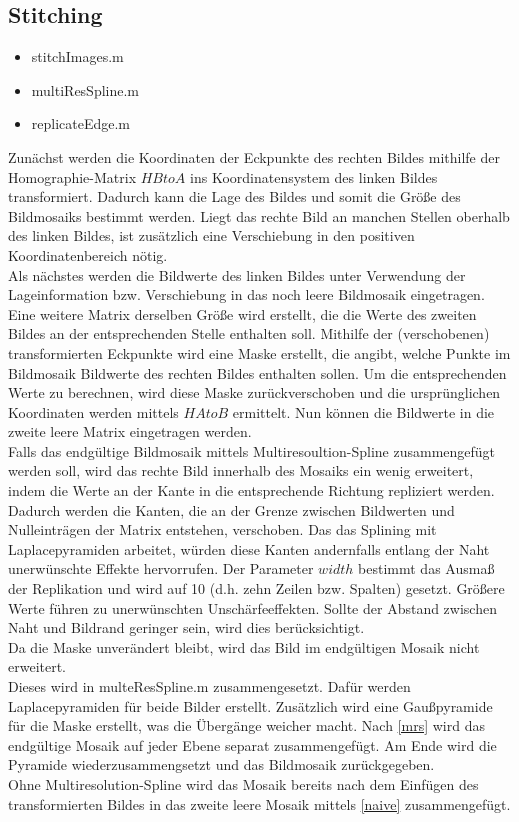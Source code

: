 \documentclass[deutsch]{scrartcl}
\begin{document}
\subsection{Stitching}
\begin{itemize}
	\item stitchImages.m 
	\item multiResSpline.m 
	\item replicateEdge.m
\end{itemize}
Zunächst werden die Koordinaten der Eckpunkte des rechten Bildes mithilfe der Homographie-Matrix $HBtoA$ ins Koordinatensystem des linken Bildes transformiert. Dadurch kann die Lage des Bildes und somit die Größe des Bildmosaiks bestimmt werden. Liegt das rechte Bild an manchen Stellen oberhalb des linken Bildes, ist zusätzlich eine Verschiebung in den positiven Koordinatenbereich nötig. \\
Als nächstes werden die Bildwerte des linken Bildes unter Verwendung der Lageinformation bzw. Verschiebung in das noch leere Bildmosaik eingetragen. \\
Eine weitere Matrix derselben Größe wird erstellt, die die Werte des zweiten Bildes an der entsprechenden Stelle enthalten soll. Mithilfe der (verschobenen) transformierten Eckpunkte wird eine Maske erstellt, die angibt, welche Punkte im Bildmosaik Bildwerte des rechten Bildes enthalten sollen. Um die entsprechenden Werte zu berechnen, wird diese Maske zurückverschoben und die ursprünglichen Koordinaten werden mittels $HAtoB$ ermittelt. Nun können die Bildwerte in die zweite leere Matrix eingetragen werden. \\
Falls das endgültige Bildmosaik mittels Multiresoultion-Spline zusammengefügt werden soll, wird das rechte Bild innerhalb des Mosaiks ein wenig erweitert, indem die Werte an der Kante in die entsprechende Richtung repliziert werden. Dadurch werden die Kanten, die an der Grenze zwischen Bildwerten und Nulleinträgen der Matrix entstehen, verschoben. Das das Splining mit Laplacepyramiden arbeitet, würden diese Kanten andernfalls entlang der Naht unerwünschte Effekte hervorrufen. Der Parameter $width$ bestimmt das Ausmaß der Replikation und wird auf 10 (d.h. zehn Zeilen bzw. Spalten) gesetzt. Größere Werte führen zu unerwünschten Unschärfeeffekten. Sollte der Abstand zwischen Naht und Bildrand geringer sein, wird dies berücksichtigt. \\
 Da die Maske unverändert bleibt, wird das Bild im endgültigen Mosaik nicht erweitert. \\
Dieses wird in multeResSpline.m zusammengesetzt. Dafür werden Laplacepyramiden für beide Bilder erstellt. Zusätzlich wird eine Gaußpyramide für die Maske erstellt, was die Übergänge weicher macht. Nach \eqref{mrs} wird das endgültige Mosaik auf jeder Ebene separat zusammengefügt. Am Ende wird die Pyramide wiederzusammengsetzt und das Bildmosaik zurückgegeben. \\
Ohne Multiresolution-Spline wird das Mosaik bereits nach dem Einfügen des transformierten Bildes in das zweite leere Mosaik mittels \eqref{naive} zusammengefügt.\\\\
\end{document}

